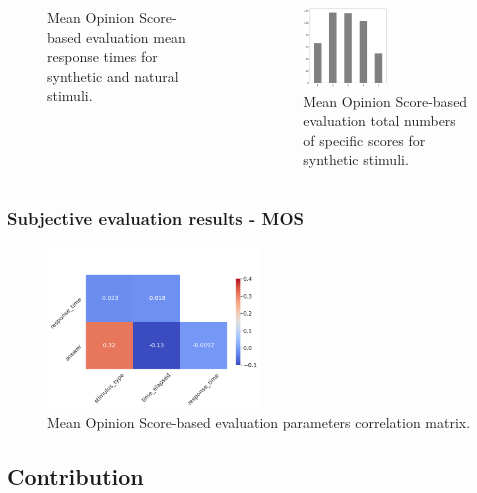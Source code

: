 \documentclass[a4paper,9pt]{beamer}
\theoremstyle{mytheoremstyle}
\begin{document}
\begin{frame}
\begin{columns}
\begin{figure}
\begin{center}
\end{center}
	\caption{Mean Opinion Score-based evaluation mean response times for synthetic and natural stimuli.}
\end{figure}
\begin{figure}
\begin{center}
\includegraphics[width=0.5\textwidth]{res/MOS_number_of_scores_synthetic_stimuli}
\end{center}
\caption{Mean Opinion Score-based evaluation total numbers of specific scores for synthetic stimuli.}
\end{figure}
\end{columns}
\end{frame}

\begin{frame}
\frametitle{Subjective evaluation results - MOS}
\begin{figure}
\begin{center}
\includegraphics[width=0.5\textwidth]{res/MOS_correlation_matrix}
\end{center}
\caption{Mean Opinion Score-based evaluation parameters correlation matrix.}
\end{figure}
\end{frame}


\subsection{Contribution}
\end{document}
